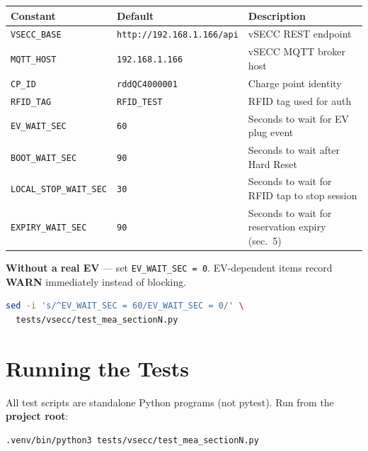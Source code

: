 \documentclass[11pt, a4paper]{article}
\begin{document}
\begin{center}
\begin{tabular}{L{4.5cm} L{3.5cm} L{6cm}}
\toprule
\textbf{Constant} & \textbf{Default} & \textbf{Description} \\
\midrule
\texttt{VSECC\_BASE}        & \texttt{http://192.168.1.166/api} & vSECC REST endpoint \\
\texttt{MQTT\_HOST}         & \texttt{192.168.1.166}            & vSECC MQTT broker host \\
\texttt{CP\_ID}             & \texttt{rddQC4000001}             & Charge point identity \\
\texttt{RFID\_TAG}          & \texttt{RFID\_TEST}               & RFID tag used for auth \\
\texttt{EV\_WAIT\_SEC}      & \texttt{60}                       & Seconds to wait for EV plug event \\
\texttt{BOOT\_WAIT\_SEC}    & \texttt{90}                       & Seconds to wait after Hard Reset \\
\texttt{LOCAL\_STOP\_WAIT\_SEC} & \texttt{30}                   & Seconds to wait for RFID tap to stop session \\
\texttt{EXPIRY\_WAIT\_SEC}  & \texttt{90}                       & Seconds to wait for reservation expiry (sec.~5) \\
\bottomrule
\end{tabular}
\end{center}

\bigskip
\textbf{Without a real EV} --- set \texttt{EV\_WAIT\_SEC~=~0}.
EV-dependent items record \textbf{WARN} immediately instead of blocking.

\begin{lstlisting}[language=bash]
sed -i 's/^EV_WAIT_SEC = 60/EV_WAIT_SEC = 0/' \
  tests/vsecc/test_mea_sectionN.py
\end{lstlisting}

\section{Running the Tests}

All test scripts are standalone Python programs (not pytest).
Run from the \textbf{project root}:

\begin{lstlisting}[language=bash]
.venv/bin/python3 tests/vsecc/test_mea_sectionN.py
\end{lstlisting}
\end{document}
